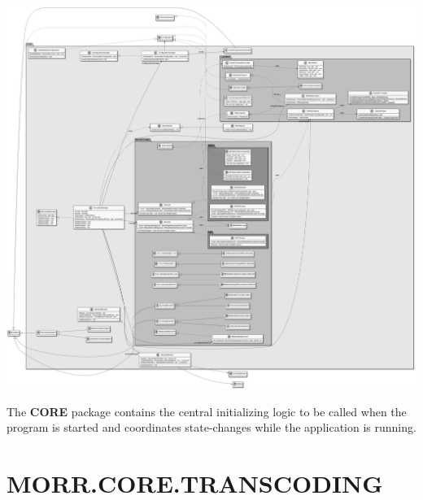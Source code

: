 \begin{center}
    \includegraphics[width=1.0\textwidth]{resources/Packages/CORE.png}
\end{center}

The \textbf{CORE} package contains the central initializing logic to be called when the program is started and coordinates state-changes while the application is running.

\begin{packif}
\end{packif}

\begin{packclass}
\end{packclass}

\begin{packpack}
\end{packpack}

\section*{MORR.CORE.TRANSCODING}

